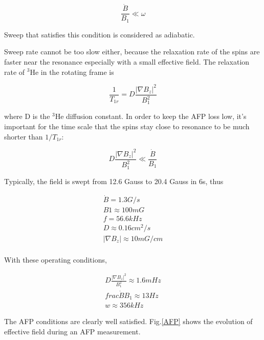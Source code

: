 \begin{equation}
\frac{\dot B}{B_{1}}\ll \omega
\end{equation}

Sweep that satisfies this condition is considered as adiabatic.

Sweep rate cannot be too slow either, because the relaxation rate of the spins are faster near the resonance especially with a small effective field. The relaxation rate of $^{3}$He in the rotating frame is 

\begin{equation}
\frac{1}{T_{1r}}=D\frac{|\nabla B_{z}|^{2}}{B_{1}^{2}} 
\end{equation}

where D is the $^{3}$He diffusion constant. In order to keep the AFP loss low, it's important for the time scale that the spins stay close to resonance to be much shorter than $1/T_{1r}$:

\begin{equation}
D\frac{|\nabla B_{z}|^{2}}{B_{1}^{2}} \ll \frac{\dot B}{B_{1}}
\end{equation}

Typically, the field is swept from 12.6 Gauss to 20.4 Gauss in 6s, thus

\begin{subequations}
	\begin{gather}
	\dot B = 1.3G/s\\
	B1 \approx 100mG\\
	f = 56.6kHz\\
	D \approx 0.16cm^2/s\\
	|\nabla B_{z}| \approx 10mG/cm\\
	\end{gather}
\end{subequations}

With these operating conditions, 

\begin{subequations}
	\begin{gather}
	D\frac{|\nabla B_{z}|^{2}}{B_{1}^{2}} \approx 1.6mHz\\
	frac{\dot B}{B_{1}} \approx 13Hz\\
	w \approx 356kHz
	\end{gather}
\end{subequations}

The AFP conditions are clearly well satisfied. Fig.\ref{AFP} shows the evolution of effective field during an AFP measurement.

